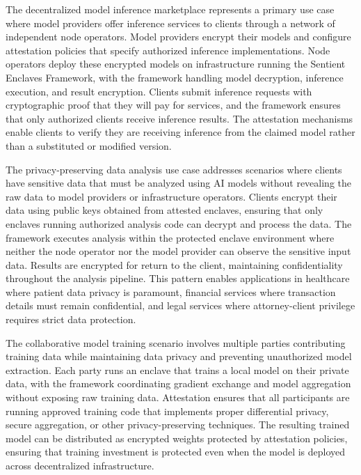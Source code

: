 The decentralized model inference marketplace represents a primary use case where model providers offer inference services to clients through a network of independent node operators. Model providers encrypt their models and configure attestation policies that specify authorized inference implementations. Node operators deploy these encrypted models on infrastructure running the Sentient Enclaves Framework, with the framework handling model decryption, inference execution, and result encryption. Clients submit inference requests with cryptographic proof that they will pay for services, and the framework ensures that only authorized clients receive inference results. The attestation mechanisms enable clients to verify they are receiving inference from the claimed model rather than a substituted or modified version.

The privacy-preserving data analysis use case addresses scenarios where clients have sensitive data that must be analyzed using AI models without revealing the raw data to model providers or infrastructure operators. Clients encrypt their data using public keys obtained from attested enclaves, ensuring that only enclaves running authorized analysis code can decrypt and process the data. The framework executes analysis within the protected enclave environment where neither the node operator nor the model provider can observe the sensitive input data. Results are encrypted for return to the client, maintaining confidentiality throughout the analysis pipeline. This pattern enables applications in healthcare where patient data privacy is paramount, financial services where transaction details must remain confidential, and legal services where attorney-client privilege requires strict data protection.

The collaborative model training scenario involves multiple parties contributing training data while maintaining data privacy and preventing unauthorized model extraction. Each party runs an enclave that trains a local model on their private data, with the framework coordinating gradient exchange and model aggregation without exposing raw training data. Attestation ensures that all participants are running approved training code that implements proper differential privacy, secure aggregation, or other privacy-preserving techniques. The resulting trained model can be distributed as encrypted weights protected by attestation policies, ensuring that training investment is protected even when the model is deployed across decentralized infrastructure.

